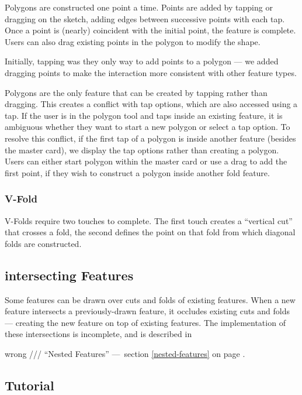 Polygons are constructed one point a time. Points are added by tapping
or dragging on the sketch, adding edges between successive points with
each tap. Once a point is (nearly) coincident with the initial point,
the feature is complete. Users can also drag existing points in the
polygon to modify the shape.

Initially, tapping was they only way to add points to a polygon --- we
added dragging points to make the interaction more consistent with other
feature types.

Polygons are the only feature that can be created by tapping rather than
dragging. This creates a conflict with tap options, which are also
accessed using a tap. If the user is in the polygon tool and taps inside
an existing feature, it is ambiguous whether they want to start a new
polygon or select a tap option. To resolve this conflict, if the first
tap of a polygon is inside another feature (besides the master card), we
display the tap options rather than creating a polygon. Users can either
start polygon within the master card or use a drag to add the first
point, if they wish to construct a polygon inside another fold feature.

\subsubsection{V-Fold}\label{v-fold}

V-Folds require two touches to complete. The first touch creates a
``vertical cut'' that crosses a fold, the second defines the point on
that fold from which diagonal folds are constructed.

\subsection{intersecting Features}\label{intersecting-features}

Some features can be drawn over cuts and folds of existing features.
When a new feature intersects a previously-drawn feature, it occludes
existing cuts and folds --- creating the new feature on top of existing
features. The implementation of these intersections is incomplete, and
is described in

wrong /// ``Nested Features'' ---~section \ref{nested-features} on page
\pageref{nested-features}.

\subsection{Tutorial}\label{tutorial}

